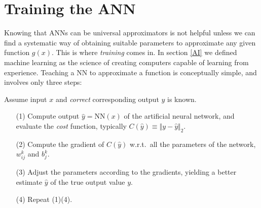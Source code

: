 \documentclass[../../master.tex]{subfiles}
\begin{document}
\section{Training the ANN}
Knowing that ANNs can be universal approximators is not helpful unless we can find a systematic way of obtaining suitable parameters to approximate any given function $g(x)$. This is where \emph{training} comes in. In section \ref{AI} we defined machine learning as the science of creating computers capable of learning from experience. Teaching a NN to approximate a function is conceptually simple, and involves only three steps:
\begin{shadeframe}
Assume input $x$ and \emph{correct} corresponding output $y$ is known.
\begin{itemize}
	\item[(1)] Compute output $\hat y=\text{NN}(x)$ of the artificial neural network, and evaluate the \emph{cost} function, typically $C(\hat y)\equiv \Vert y-\hat y\Vert_2$. 
	\item[(2)] Compute the gradient of $C(\hat y)$ w.r.t.\ all the parameters of the network, $w_{ij}^k$ and $b^k_j$.  
	\item[(3)] Adjust the parameters according to the gradients, yielding a better estimate $\hat y$ of the true output value $y$. 
	\item[(4)] Repeat (1)\textemdash(4).
\end{itemize}
\end{shadeframe}
\end{document}
